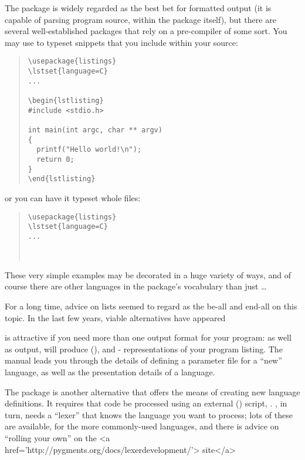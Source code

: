 The  package is widely regarded as the best bet for
formatted output (it is capable of parsing program source, within the
package itself), but there are several well-established packages that
rely on a pre-compiler of some sort.  You may use 
to typeset snippets that you include within your source:
\begin{quote}
\begin{verbatim}
\usepackage{listings}
\lstset{language=C}
...

\begin{lstlisting}
#include <stdio.h>

int main(int argc, char ** argv)
{
  printf("Hello world!\n");
  return 0;
}
\end{lstlisting}

\end{verbatim}
\end{quote}
or you can have it typeset whole files:
\begin{quote}
\begin{verbatim}
\usepackage{listings}
\lstset{language=C}
...



\end{verbatim}
\end{quote}
These very simple examples may be decorated in a huge variety of ways,
and of course there are other languages in the package's vocabulary
than just \dots{}

For a long time, advice on \AllTeX{} lists seemed to regard
 as the be-all and end-all on this topic.  In the
last few years, viable alternatives have appeared

 is attractive if you need more than one output
format for your program: as well as \AllTeX{} output,
 will produce (), 
and - representations of your program listing.  The
manual leads you through the details of defining a parameter file for
a ``new'' language, as well as the presentation details of a language.

The  package is another alternative that offers
the means of creating new language definitions.  It
requires that code be processed using an external ()
script, \href{http://pygments.org/}{}.
, in turn, needs a ``lexer'' that knows the
language you want to process; lots of these are available, for the
more commonly-used languages, and there is advice on ``rolling your
own'' on the %
<a href='http://pygments.org/docs/lexerdevelopment/'> site</a>


